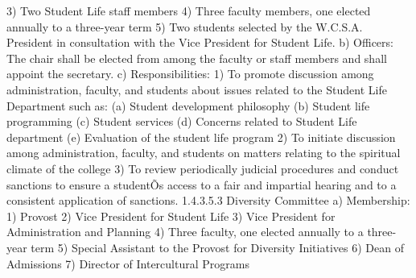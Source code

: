\documentclass[letterpaper, 11pt]{article}
\begin{document}
			3) Two Student Life staff members
			4) Three faculty members, one elected annually to a three-year term
			5) Two students selected by the W.C.S.A. President in consultation with the Vice President for Student Life.
			b) Officers:
			The chair shall be elected from among the faculty or staff members and shall appoint the secretary.
			c) Responsibilities:
			1) To promote discussion among administration, faculty, and students about issues related to the Student Life Department such as:
			(a) Student development philosophy
			(b) Student life programming
			(c) Student services
			(d) Concerns related to Student Life department
			(e) Evaluation of the student life program
			2) To initiate discussion among administration, faculty, and students on matters relating to the spiritual climate of the college
			3) To review periodically judicial procedures and conduct sanctions to ensure a studentÕs access to a fair and impartial hearing and to a consistent application of sanctions.
			1.4.3.5.3 Diversity Committee
			a) Membership:
			1) Provost
			2) Vice President for Student Life
			3) Vice President for Administration and Planning
			4) Three faculty, one elected annually to a three-year term
			5) Special Assistant to the Provost for Diversity Initiatives
			6) Dean of Admissions
			7) Director of Intercultural Programs
\end{document}

